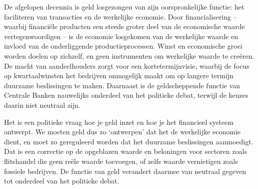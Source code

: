 
De afgelopen decennia is geld losgezongen van zijn oorspronkelijke functie: het faciliteren van transacties en de werkelijke economie. Door financialisering – waarbij financiële producten een steeds groter deel van de economische waarde vertegenwoordigen – is de economie losgekomen van de werkelijke waarde en invloed van de onderliggende productieprocessen. Winst en economische groei worden doelen op zichzelf, en geen instrumenten om werkelijke waarde te creëren. De macht van aandeelhouders zorgt voor een kortetermijnvisie, waarbij de focus op kwartaalwinsten het bedrijven onmogelijk maakt om op langere termijn duurzame beslissingen te maken. Daarnaast is de geldscheppende functie van Centrale Banken nauwelijks onderdeel van het politieke debat, terwijl de keuzes daarin niet neutraal zijn.

Het is een politieke vraag hoe je geld inzet en hoe je het financieel systeem ontwerpt. We moeten geld dus zo ‘ontwerpen’ dat het de werkelijke economie dient, en moet zo gereguleerd worden dat het duurzame beslissingen aanmoedigt. Dat is een correctie op de opgeblazen waarde en beloningen voor sectoren zoals flitshandel die geen reële waarde toevoegen, of zelfs waarde vernietigen zoals fossiele bedrijven. De functie van geld verandert daarmee van neutraal gegeven tot onderdeel van het politieke debat.
